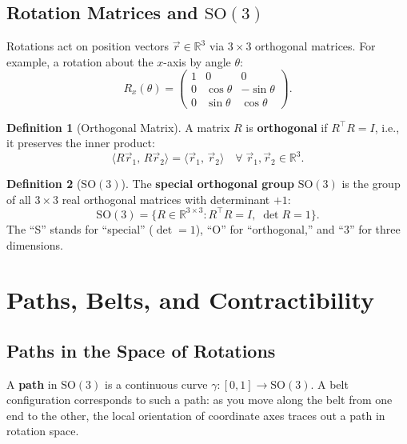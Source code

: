 \documentclass[11pt,a4paper]{article}
\theoremstyle{definition}
\newtheorem{definition}{Definition}[section]
\theoremstyle{plain}
\theoremstyle{remark}
\begin{document}
\subsection{Rotation Matrices and $\mathrm{SO}(3)$}

Rotations act on position vectors $\vec{r} \in \mathbb{R}^3$ via $3 \times 3$ orthogonal matrices. For example, a rotation about the $x$-axis by angle $\theta$:
\[
    R_x(\theta) = \begin{pmatrix} 1 & 0 & 0 \\ 0 & \cos\theta & -\sin\theta \\ 0 & \sin\theta & \cos\theta \end{pmatrix}.
\]

\begin{definition}[Orthogonal Matrix]
    A matrix $R$ is \textbf{orthogonal} if $R^\top R = I$, i.e., it preserves the inner product:
    \[
        \langle R\vec{r}_1,\, R\vec{r}_2 \rangle = \langle \vec{r}_1,\, \vec{r}_2 \rangle \quad \forall\; \vec{r}_1, \vec{r}_2 \in \mathbb{R}^3.
    \]
\end{definition}

\begin{definition}[$\mathrm{SO}(3)$]
    The \textbf{special orthogonal group} $\mathrm{SO}(3)$ is the group of all $3 \times 3$ real orthogonal matrices with determinant $+1$:
    \[
        \mathrm{SO}(3) = \{ R \in \mathbb{R}^{3\times 3} : R^\top R = I,\; \det R = 1 \}.
    \]
    The ``S'' stands for ``special'' ($\det = 1$), ``O'' for ``orthogonal,'' and ``3'' for three dimensions.
\end{definition}

\section{Paths, Belts, and Contractibility}

\subsection{Paths in the Space of Rotations}

A \textbf{path} in $\mathrm{SO}(3)$ is a continuous curve $\gamma: [0,1] \to \mathrm{SO}(3)$. A belt configuration corresponds to such a path: as you move along the belt from one end to the other, the local orientation of coordinate axes traces out a path in rotation space.
\end{document}

